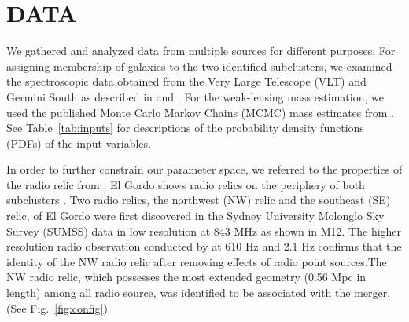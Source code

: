 \section{DATA} 
We gathered and analyzed data from multiple sources for different
purposes. For assigning membership of galaxies to the two identified subclusters, we
examined the spectroscopic data obtained from the Very Large Telescope (VLT) and
Germini South as described in  and \citet{Sifon13}.
For the weak-lensing mass estimation, we used the published
Monte Carlo Markov Chains (MCMC) mass estimates from .
See Table~\ref{tab:inputs} for descriptions of the probability density
functions (PDFs) of the input
variables. \par 
In order to further constrain our parameter space, we referred to the properties of
the radio relic from \citet{L13}. El Gordo shows radio relics on the
periphery of both subclusters . Two radio relics, the
northwest (NW) relic and the southeast (SE) relic, of El Gordo were first
discovered in the Sydney University Molonglo Sky Survey (SUMSS) data in low
resolution at 843 MHz \citep{Mauch03} as shown in M12. The higher
resolution radio observation conducted by \cite{L13} at 610 \mega Hz and
2.1 \giga Hz confirms that the identity of the NW radio relic
after removing effects of radio point sources.The NW radio relic, which
possesses the most extended geometry (0.56 Mpc in length)
among all radio source, was identified to be associated with the
merger. (See Fig.~\ref{fig:config})
